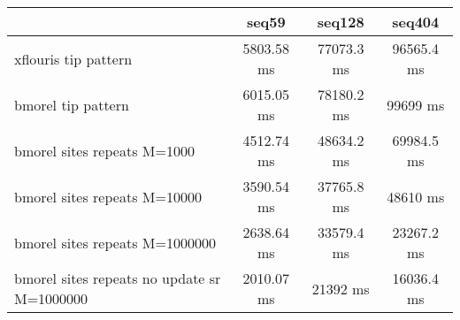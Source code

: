 \begin{tabular}{|l|c|c|c|}
\hline
 & seq59 & seq128 & seq404  \\
\hline
xflouris tip pattern & 5803.58 ms & 77073.3 ms & 96565.4 ms\\
\hline
bmorel tip pattern & 6015.05 ms & 78180.2 ms & 99699 ms\\
\hline
bmorel sites repeats M=1000 & 4512.74 ms & 48634.2 ms & 69984.5 ms\\
\hline
bmorel sites repeats M=10000 & 3590.54 ms & 37765.8 ms & 48610 ms\\
\hline
bmorel sites repeats M=1000000 & 2638.64 ms & 33579.4 ms & 23267.2 ms\\
\hline
bmorel sites repeats no update sr  M=1000000 & 2010.07 ms & 21392 ms & 16036.4 ms\\
\hline
\end{tabular}
